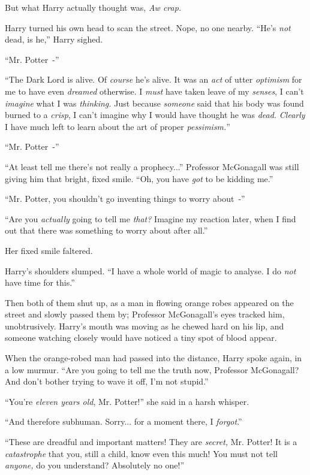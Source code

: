 But what Harry actually thought was, \emph{Aw crap.}

Harry turned his own head to scan the street. Nope, no one nearby. ``He's \emph{not} dead, is he,'' Harry sighed.

``Mr. Potter~-''

``The Dark Lord is alive. Of \emph{course} he's alive. It was an \emph{act} of utter \emph{optimism} for me to have even \emph{dreamed} otherwise. I \emph{must} have taken leave of my \emph{senses}, I can't \emph{imagine} what I was \emph{thinking.} Just because \emph{someone} said that his body was found burned to a \emph{crisp}, I can't imagine why I would have thought he was \emph{dead.} \emph{Clearly} I have much left to learn about the art of proper \emph{pessimism.}''

``Mr. Potter~-''

``At least tell me there's not really a prophecy...'' Professor McGonagall was still giving him that bright, fixed smile. ``Oh, you have \emph{got} to be kidding me.''

``Mr. Potter, you shouldn't go inventing things to worry about~-''

``Are you \emph{actually} going to tell me \emph{that?} Imagine my reaction later, when I find out that there was something to worry about after all.''

Her fixed smile faltered.

Harry's shoulders slumped. ``I have a whole world of magic to analyse. I do \emph{not} have time for this.''

Then both of them shut up, as a man in flowing orange robes appeared on the street and slowly passed them by; Professor McGonagall's eyes tracked him, unobtrusively. Harry's mouth was moving as he chewed hard on his lip, and someone watching closely would have noticed a tiny spot of blood appear.

When the orange-robed man had passed into the distance, Harry spoke again, in a low murmur. ``Are you going to tell me the truth now, Professor McGonagall? And don't bother trying to wave it off, I'm not stupid.''

``You're \emph{eleven years old}, Mr. Potter!'' she said in a harsh whisper.

``And therefore subhuman. Sorry... for a moment there, I \emph{forgot}.''

``These are dreadful and important matters! They are \emph{secret,} Mr. Potter! It is a \emph{catastrophe} that you, still a child, know even this much! You must not tell \emph{anyone,} do you understand? Absolutely no one!''

